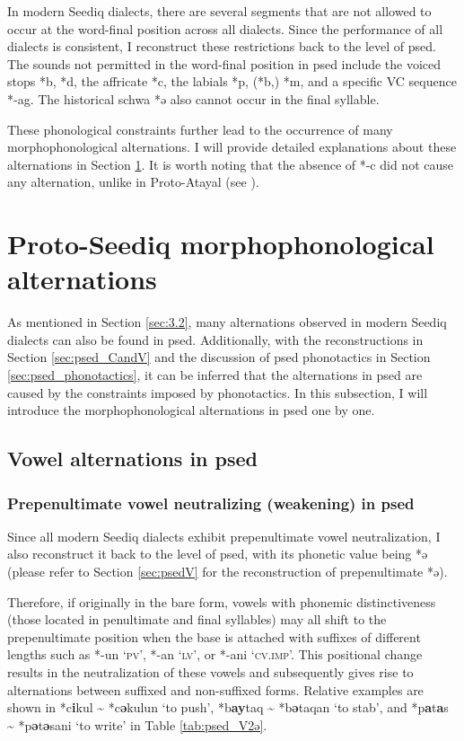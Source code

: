 In modern Seediq dialects, there are several segments that are not allowed to occur at the word-final position across all dialects. Since the performance of all dialects is consistent, I reconstruct these restrictions back to the level of \acl{psed}. The sounds not permitted in the word-final position in \acl{psed} include the voiced stops *b, *d, the affricate *c, the labials *p, (*b,) *m, and a specific VC sequence *-ag. The historical schwa *ə also cannot occur in the final syllable.

These phonological constraints further lead to the occurrence of many morphophonological alternations. I will provide detailed explanations about these alternations in Section \ref{sec:psed_alter}. It is worth noting that the absence of *-c did not cause any alternation, unlike in Proto-Atayal (see \cite[60--61,138--139]{goderich2020phd}).

\section{Proto-Seediq morphophonological alternations} \label{sec:psed_alter}

As mentioned in Section \ref{sec:3.2}, many alternations observed in modern Seediq dialects can also be found in \acl{psed}. Additionally, with the reconstructions in Section \ref{sec:psed_CandV} and the discussion of \acl{psed} phonotactics in Section \ref{sec:psed_phonotactics}, it can be inferred that the alternations in \acl{psed} are caused by the constraints imposed by phonotactics. In this subsection, I will introduce the morphophonological alternations in \acl{psed} one by one.

\subsection{Vowel alternations in \acl{psed}}

\subsubsection{Prepenultimate vowel neutralizing (weakening) in \acl{psed}}

Since all modern Seediq dialects exhibit prepenultimate vowel neutralization, I also reconstruct it back to the level of \acl{psed}, with its phonetic value being *ə (please refer to Section \ref{sec:psedV} for the reconstruction of prepenultimate *ə).

Therefore, if originally in the bare form, vowels with phonemic distinctiveness (those located in penultimate and final syllables) may all shift to the prepenultimate position when the base is attached with suffixes of different lengths such as *-un `\textsc{pv}', *-an `\textsc{lv}', or *-ani `\textsc{cv.imp}'. This positional change results in the neutralization of these vowels and subsequently gives rise to alternations between suffixed and non-suffixed forms. Relative examples are shown in *c\textbf{i}kul \~{} *c\textbf{ə}kulun `to push', *b\textbf{ay}taq \~{} *b\textbf{ə}taqan `to stab', and *p\textbf{a}t\textbf{a}s \~{} *p\textbf{ə}t\textbf{ə}sani `to write' in Table \ref{tab:psed_V2ə}. 

